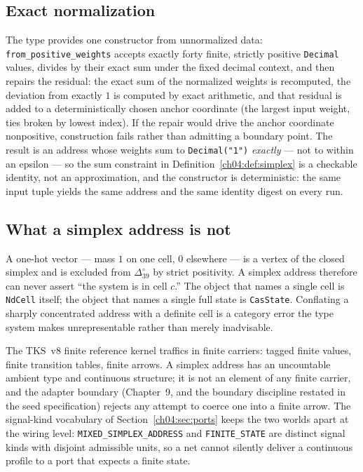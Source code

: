 \subsection{Exact normalization}\label{ch04:sec:normalization}

The type provides one constructor from unnormalized data:
\texttt{from\_positive\_weights} accepts exactly forty finite, strictly
positive \texttt{Decimal} values, divides by their exact sum under the
fixed decimal context, and then repairs the residual: the exact sum of the
normalized weights is recomputed, the deviation from exactly $1$ is
computed by exact arithmetic, and that residual is added to a
deterministically chosen anchor coordinate (the largest input weight, ties
broken by lowest index). If the repair would drive the anchor coordinate
nonpositive, construction fails rather than admitting a boundary point.
The result is an address whose weights sum to \texttt{Decimal("1")}
\emph{exactly} --- not to within an epsilon --- so the sum constraint in
Definition~\ref{ch04:def:simplex} is a checkable identity, not an
approximation, and the constructor is deterministic: the same input tuple
yields the same address and the same identity digest on every run.

\subsection{What a simplex address is not}\label{ch04:sec:simplexnot}

\begin{ruleenv}\label{ch04:rule:notonehot}
A one-hot vector --- mass $1$ on one cell, $0$ elsewhere --- is a vertex of
the closed simplex and is excluded from $\Delta_{39}^{\circ}$ by strict
positivity. A simplex address therefore can never assert ``the system is in
cell $c$.'' The object that names a single cell is \texttt{NdCell} itself;
the object that names a single full state is \texttt{CasState}. Conflating
a sharply concentrated address with a definite cell is a category error the
type system makes unrepresentable rather than merely inadvisable.
\end{ruleenv}

\begin{ruleenv}\label{ch04:rule:nottks}
The TKS~v8 finite reference kernel traffics in finite carriers: tagged
finite values, finite transition tables, finite arrows. A simplex address
has an uncountable ambient type and continuous structure; it is not an
element of any finite carrier, and the adapter boundary
(Chapter~9, and the boundary discipline restated in the
seed specification) rejects any attempt to coerce one into a finite arrow.
The signal-kind vocabulary of Section~\ref{ch04:sec:ports} keeps the two
worlds apart at the wiring level: \texttt{MIXED\_SIMPLEX\_ADDRESS} and
\texttt{FINITE\_STATE} are distinct signal kinds with disjoint admissible
units, so a net cannot silently deliver a continuous profile to a port that
expects a finite state.
\end{ruleenv}

